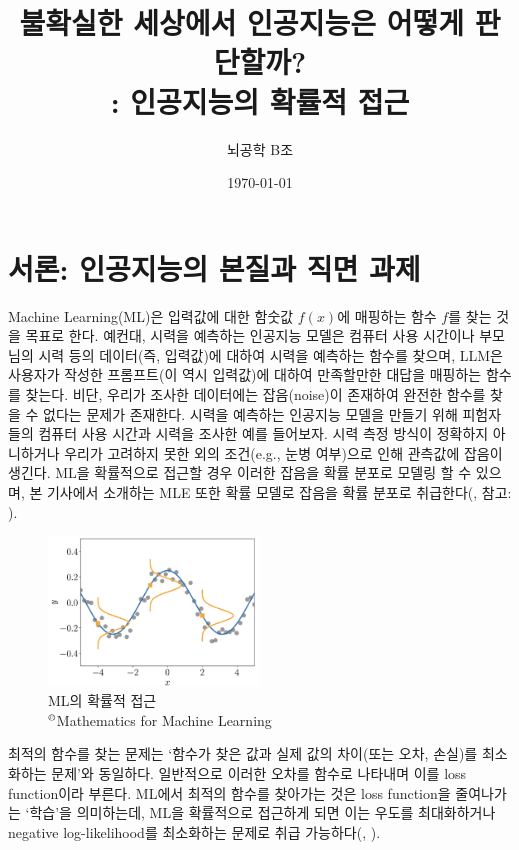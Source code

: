 \documentclass{article}
\title{불확실한 세상에서 인공지능은 어떻게 판단할까?\\\Large: 인공지능의 확률적 접근}
\author{뇌공학 B조}
\date{\today}
\begin{document}
\maketitle



\section{서론: 인공지능의 본질과 직면 과제}
\label{sec:intro}
Machine Learning(ML)은 입력값에 대한 함숫값 $f(x)$에 매핑하는 함수 $f$를 찾는 것을 목표로 한다. 예컨대, 시력을 예측하는 인공지능 모델은 컴퓨터 사용 시간이나 부모님의 시력 등의 데이터(즉, 입력값)에 대하여 시력을 예측하는 함수를 찾으며, LLM은 사용자가 작성한 프롬프트(이 역시 입력값)에 대하여 만족할만한 대답을 매핑하는 함수를 찾는다. 비단, 우리가 조사한 데이터에는 잡음(noise)이 존재하여 완전한 함수를 찾을 수 없다는 문제가 존재한다. 시력을 예측하는 인공지능 모델을 만들기 위해 피험자들의 컴퓨터 사용 시간과 시력을 조사한 예를 들어보자. 시력 측정 방식이 정확하지 아니하거나 우리가 고려하지 못한 외의 조건(e.g., 눈병 여부)으로 인해 관측값에 잡음이 생긴다. ML을 확률적으로 접근할 경우 이러한 잡음을 확률 분포로 모델링 할 수 있으며, 본 기사에서 소개하는 MLE 또한 확률 모델로 잡음을 확률 분포로 취급한다(, 참고: ).

\begin{figure}[htbp]
  \centering
  \includegraphics[width=0.5\textwidth]{function_with_noise}
  \caption{ML의 확률적 접근\\\footnotesize$\textsuperscript{\textcopyright}$Mathematics for Machine Learning\cite{Deisenroth_Ong_Faisal_2021}}
  \label{fig:function_with_noise}
\end{figure}

최적의 함수를 찾는 문제는 `함수가 찾은 값과 실제 값의 차이(또는 오차, 손실)를 최소화하는 문제'와 동일하다. 일반적으로 이러한 오차를 함수로 나타내며 이를 loss function이라 부른다. ML에서 최적의 함수를 찾아가는 것은 loss function을 줄여나가는 `학습'을 의미하는데, ML을 확률적으로 접근하게 되면 이는 우도를 최대화하거나 negative log-likelihood를 최소화하는 문제로 취급 가능하다(, ).
\end{document}

